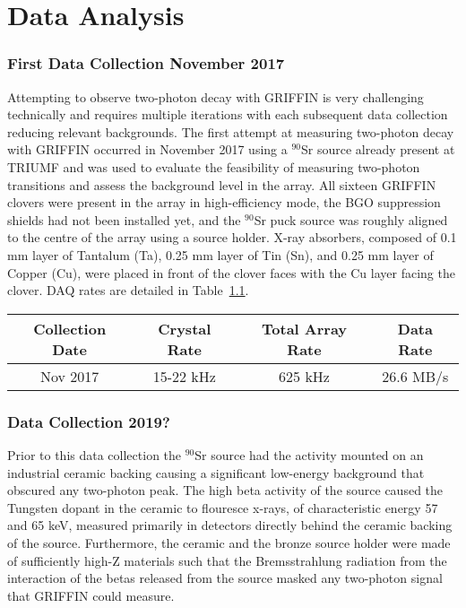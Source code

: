 \documentclass[cnatzke_thesis_proposal.tex]{subfiles}
\begin{document}
\chapter{Data Analysis}

\subsection{First Data Collection November 2017}
Attempting to observe two-photon decay with GRIFFIN is very challenging technically and requires multiple iterations with each subsequent data collection reducing relevant backgrounds. 
The first attempt at measuring two-photon decay with GRIFFIN occurred in November 2017 using a $^{90}$Sr source already present at TRIUMF and was used to evaluate the feasibility of measuring two-photon transitions and assess the background level in the array. 
All sixteen GRIFFIN clovers were present in the array in high-efficiency mode, the BGO suppression shields had not been installed yet, and the $^{90}$Sr puck source was roughly aligned to the centre of the array using a source holder. 
X-ray absorbers, composed of 0.1 mm layer of Tantalum (Ta), 0.25 mm layer of Tin (Sn), and 0.25 mm layer of Copper (Cu), were placed in front of the clover faces with the Cu layer facing the clover. 
DAQ rates are detailed in Table~\ref{tab:daq_rates}.

\begin{table}[]
  \begin{tabular}{c|ccc}
  \textbf{Collection Date} & \textbf{Crystal Rate} & \textbf{Total Array Rate} & \textbf{Data Rate} \\ \hline
  Nov 2017                 & 15-22 kHz             & 625 kHz                   & 26.6 MB/s         
  \end{tabular}
  \label{tab:daq_rates}
\end{table}


\subsection{Data Collection 2019?}

Prior to this data collection the $^{90}$Sr source had the activity mounted on an industrial ceramic backing causing a significant low-energy background that obscured any two-photon peak. 
The high beta activity of the source caused the Tungsten dopant in the ceramic to flouresce x-rays, of characteristic energy 57 and 65 keV, measured primarily in detectors directly behind the ceramic backing of the source. 
Furthermore, the ceramic and the bronze source holder were made of sufficiently high-Z materials such that the Bremsstrahlung radiation from the interaction of the betas released from the source masked any two-photon signal that GRIFFIN could measure. 
\end{document}
